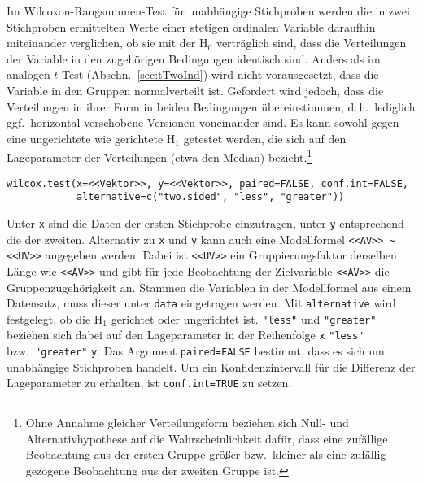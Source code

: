 Im Wilcoxon-Rangsummen-Test für unabhängige Stichproben werden die in zwei Stichproben ermittelten Werte einer stetigen ordinalen Variable daraufhin miteinander verglichen, ob sie mit der $\text{H}_{0}$ verträglich sind, dass die Verteilungen der Variable in den zugehörigen Bedingungen identisch sind. Anders als im analogen $t$-Test (Abschn.\ \ref{sec:tTwoInd}) wird nicht vorausgesetzt, dass die Variable in den Gruppen normalverteilt ist. Gefordert wird jedoch, dass die Verteilungen in ihrer Form in beiden Bedingungen übereinstimmen, d.\,h.\ lediglich ggf.\ horizontal verschobene Versionen voneinander sind. Es kann sowohl gegen eine ungerichtete wie gerichtete $\text{H}_{1}$ getestet werden, die sich auf den Lageparameter der Verteilungen (etwa den Median) bezieht.\footnote{Ohne Annahme gleicher Verteilungsform beziehen sich Null- und Alternativhypothese auf die Wahrscheinlichkeit dafür, dass eine zufällige Beobachtung aus der ersten Gruppe größer bzw.\ kleiner als eine zufällig gezogene Beobachtung aus der zweiten Gruppe ist.}
\begin{lstlisting}
wilcox.test(x=<<Vektor>>, y=<<Vektor>>, paired=FALSE, conf.int=FALSE,
            alternative=c("two.sided", "less", "greater"))
\end{lstlisting}

Unter \lstinline!x! sind die Daten der ersten Stichprobe einzutragen, unter \lstinline!y! entsprechend die der zweiten. Alternativ zu \lstinline!x! und \lstinline!y! kann auch eine Modellformel \lstinline!<<AV>> ~ <<UV>>! angegeben werden. Dabei ist \lstinline!<<UV>>! ein Gruppierungsfaktor derselben Länge wie \lstinline!<<AV>>! und gibt für jede Beobachtung der Zielvariable \lstinline!<<AV>>! die Gruppenzugehörigkeit an. Stammen die Variablen in der Modellformel aus einem Datensatz, muss dieser unter \lstinline!data! eingetragen werden. Mit \lstinline!alternative! wird festgelegt, ob die $\text{H}_{1}$ gerichtet oder ungerichtet ist. \lstinline!"less"! und \lstinline!"greater"! beziehen sich dabei auf den Lageparameter in der Reihenfolge \lstinline!x! \lstinline!"less"! bzw.\ \lstinline!"greater"! \lstinline!y!. Das Argument \lstinline!paired=FALSE! bestimmt, dass es sich um unabhängige Stichproben handelt. Um ein Konfidenzintervall für die Differenz der Lageparameter zu erhalten, ist \lstinline!conf.int=TRUE! zu setzen.

